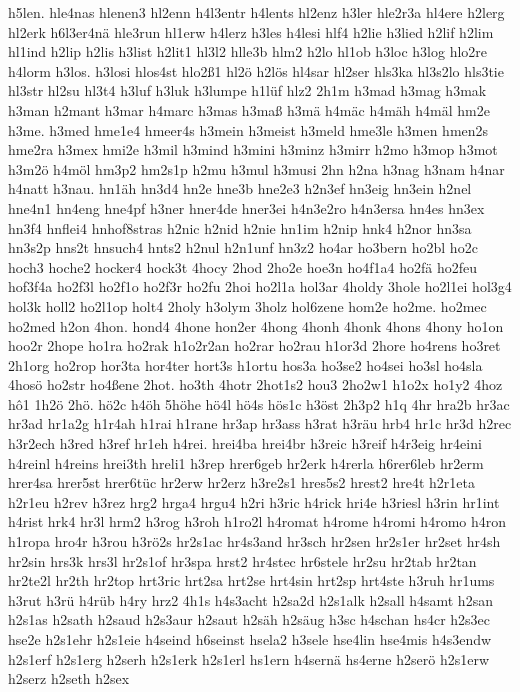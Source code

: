 {h5len.
hle4nas
hlenen3
hl2enn
h4l3entr
h4lents
hl2enz
h3ler
hle2r3a
hl4ere
h2lerg
hl2erk
h6l3er4nä
hle3run
hl1erw
h4lerz
h3les
h4lesi
hlf4
h2lie
h3lied
h2lif
h2lim
hl1ind
h2lip
h2lis
h3list
h2lit1
hl3l2
hlle3b
hlm2
h2lo
hl1ob
h3loc
h3log
hlo2re
h4lorm
h3los.
h3losi
hlos4st
hlo2ß1
hl2ö
h2lös
hl4sar
hl2ser
hls3ka
hl3s2lo
hls3tie
hl3str
hl2su
hl3t4
h3luf
h3luk
h3lumpe
h1lüf
hlz2
2h1m
h3mad
h3mag
h3mak
h3man
h2mant
h3mar
h4marc
h3mas
h3maß
h3mä
h4mäc
h4mäh
h4mäl
hm2e
h3me.
h3med
hme1e4
hmeer4s
h3mein
h3meist
h3meld
hme3le
h3men
hmen2s
hme2ra
h3mex
hmi2e
h3mil
h3mind
h3mini
h3minz
h3mirr
h2mo
h3mop
h3mot
h3m2ö
h4möl
hm3p2
hm2s1p
h2mu
h3mul
h3musi
2hn
h2na
h3nag
h3nam
h4nar
h4natt
h3nau.
hn1äh
hn3d4
hn2e
hne3b
hne2e3
h2n3ef
hn3eig
hn3ein
h2nel
hne4n1
hn4eng
hne4pf
h3ner
hner4de
hner3ei
h4n3e2ro
h4n3ersa
hn4es
hn3ex
hn3f4
hnflei4
hnhof8stras
h2nic
h2nid
h2nie
hn1im
h2nip
hnk4
h2nor
hn3sa
hn3s2p
hns2t
hnsuch4
hnts2
h2nul
h2n1unf
hn3z2
ho4ar
ho3bern
ho2bl
ho2c
hoch3
hoche2
hocker4
hock3t
4hocy
2hod
2ho2e
hoe3n
ho4f1a4
ho2fä
ho2feu
hof3f4a
ho2f3l
ho2f1o
ho2f3r
ho2fu
2hoi
ho2l1a
hol3ar
4holdy
3hole
ho2l1ei
hol3g4
hol3k
holl2
ho2l1op
holt4
2holy
h3olym
3holz
hol6zene
hom2e
ho2me.
ho2mec
ho2med
h2on
4hon.
hond4
4hone
hon2er
4hong
4honh
4honk
4hons
4hony
ho1on
hoo2r
2hope
ho1ra
ho2rak
h1o2r2an
ho2rar
ho2rau
h1or3d
2hore
ho4rens
ho3ret
2h1org
ho2rop
hor3ta
hor4ter
hort3s
h1ortu
hos3a
ho3se2
ho4sei
ho3sl
ho4sla
4hosö
ho2str
ho4ßene
2hot.
ho3th
4hotr
2hot1s2
hou3
2ho2w1
h1o2x
ho1y2
4hoz
hô1
1h2ö
2hö.
hö2c
h4öh
5höhe
hö4l
hö4s
hös1c
h3öst
2h3p2
h1q
4hr
hra2b
hr3ac
hr3ad
hr1a2g
h1r4ah
h1rai
h1rane
hr3ap
hr3ass
h3rat
h3räu
hrb4
hr1c
hr3d
h2rec
h3r2ech
h3red
h3ref
hr1eh
h4rei.
hrei4ba
hrei4br
h3reic
h3reif
h4r3eig
hr4eini
h4reinl
h4reins
hrei3th
hreli1
h3rep
hrer6geb
hr2erk
h4rerla
h6rer6leb
hr2erm
hrer4sa
hrer5st
hrer6tüc
hr2erw
hr2erz
h3re2s1
hres5s2
hrest2
hre4t
h2r1eta
h2r1eu
h2rev
h3rez
hrg2
hrga4
hrgu4
h2ri
h3ric
h4rick
hri4e
h3riesl
h3rin
hr1int
h4rist
hrk4
hr3l
hrm2
h3rog
h3roh
h1ro2l
h4romat
h4rome
h4romi
h4romo
h4ron
h1ropa
hro4r
h3rou
h3rö2s
hr2s1ac
hr4s3and
hr3sch
hr2sen
hr2s1er
hr2set
hr4sh
hr2sin
hrs3k
hrs3l
hr2s1of
hr3spa
hrst2
hr4stec
hr6stele
hr2su
hr2tab
hr2tan
hr2te2l
hr2th
hr2top
hrt3ric
hrt2sa
hrt2se
hrt4sin
hrt2sp
hrt4ste
h3ruh
hr1ums
h3rut
h3rü
h4rüb
h4ry
hrz2
4h1s
h4s3acht
h2sa2d
h2s1alk
h2sall
h4samt
h2san
h2s1as
h2sath
h2saud
h2s3aur
h2saut
h2säh
h2säug
h3sc
h4schan
hs4cr
h2s3ec
hse2e
h2s1ehr
h2s1eie
h4seind
h6seinst
hsela2
h3sele
hse4lin
hse4mis
h4s3endw
h2s1erf
h2s1erg
h2serh
h2s1erk
h2s1erl
hs1ern
h4sernä
hs4erne
h2serö
h2s1erw
h2serz
h2seth
h2sex
}
